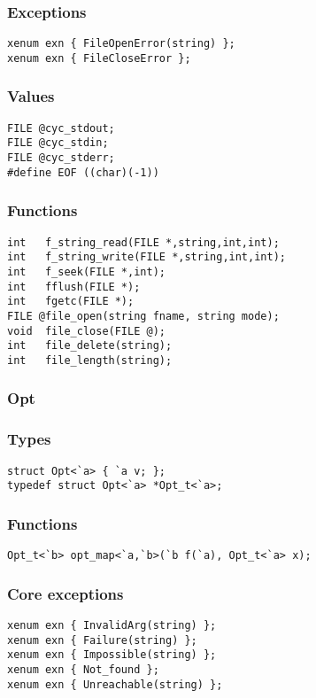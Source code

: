 \subsubsection*{Exceptions}
\begin{verbatim}
xenum exn { FileOpenError(string) };
xenum exn { FileCloseError };
\end{verbatim}

\subsubsection*{Values}
\begin{verbatim}
FILE @cyc_stdout;
FILE @cyc_stdin;
FILE @cyc_stderr;
#define EOF ((char)(-1))
\end{verbatim}

\subsubsection*{Functions}
\begin{verbatim}
int   f_string_read(FILE *,string,int,int);
int   f_string_write(FILE *,string,int,int);
int   f_seek(FILE *,int);
int   fflush(FILE *);
int   fgetc(FILE *);
FILE @file_open(string fname, string mode);
void  file_close(FILE @);
int   file_delete(string);
int   file_length(string);
\end{verbatim}

\subsubsection*{Opt}
\subsubsection*{Types}
\begin{verbatim}
struct Opt<`a> { `a v; };
typedef struct Opt<`a> *Opt_t<`a>;
\end{verbatim}

\subsubsection*{Functions}
\begin{verbatim}
Opt_t<`b> opt_map<`a,`b>(`b f(`a), Opt_t<`a> x);
\end{verbatim}

\subsubsection*{Core exceptions}
\begin{verbatim}
xenum exn { InvalidArg(string) };
xenum exn { Failure(string) };
xenum exn { Impossible(string) };
xenum exn { Not_found };
xenum exn { Unreachable(string) };
\end{verbatim}


